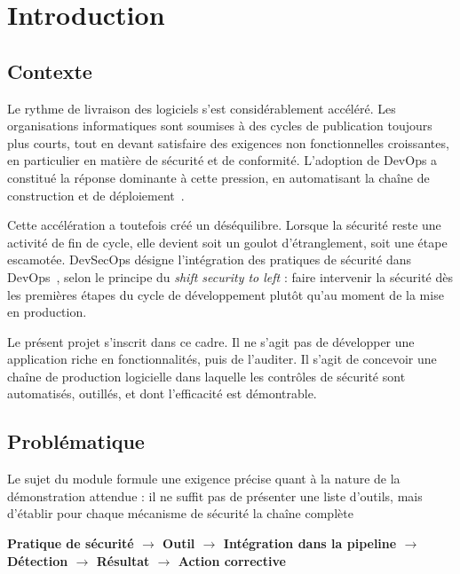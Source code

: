 \chapter{Introduction}
\label{chap:introduction}

\section{Contexte}

Le rythme de livraison des logiciels s'est considérablement accéléré. Les
organisations informatiques sont soumises à des cycles de publication toujours
plus courts, tout en devant satisfaire des exigences non fonctionnelles
croissantes, en particulier en matière de sécurité et de conformité. L'adoption
de DevOps a constitué la réponse dominante à cette pression, en automatisant la
chaîne de construction et de déploiement~\cite{prates2025}.

Cette accélération a toutefois créé un déséquilibre. Lorsque la sécurité reste
une activité de fin de cycle, elle devient soit un goulot d'étranglement, soit
une étape escamotée. DevSecOps désigne l'intégration des pratiques de sécurité
dans DevOps~\cite{myrbakken2017}, selon le principe du \emph{shift security to
left} : faire intervenir la sécurité dès les premières étapes du cycle de
développement plutôt qu'au moment de la mise en production.

Le présent projet s'inscrit dans ce cadre. Il ne s'agit pas de développer une
application riche en fonctionnalités, puis de l'auditer. Il s'agit de concevoir
une chaîne de production logicielle dans laquelle les contrôles de sécurité sont
automatisés, outillés, et dont l'efficacité est démontrable.

\section{Problématique}

Le sujet du module formule une exigence précise quant à la nature de la
démonstration attendue : il ne suffit pas de présenter une liste d'outils, mais
d'établir pour chaque mécanisme de sécurité la chaîne complète

\begin{center}
\textbf{Pratique de sécurité $\rightarrow$ Outil $\rightarrow$ Intégration dans
la pipeline $\rightarrow$ Détection $\rightarrow$ Résultat $\rightarrow$ Action
corrective}
\end{center}

